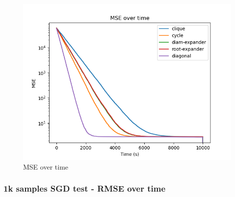 \documentclass[11pt]{article}
\makeatletter
\def\maxwidth{\ifdim\Gin@nat@width>\linewidth\linewidth
    \else\Gin@nat@width\fi}
\let\Oldincludegraphics\includegraphics
\renewcommand{\includegraphics}[1]{\Oldincludegraphics[width=.8\maxwidth]{#1}}
\makeatother
\begin{document}
\begin{figure}
\centering
\includegraphics{media/img/tests/test_003_1ksamples_stochastic/3_mse_time.png}
\caption{MSE over time}
\end{figure}

\subsubsection{1k samples SGD test - RMSE over
time}\label{k-samples-sgd-test---rmse-over-time}
\end{document}
